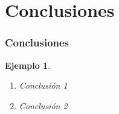 \documentclass{beamer}
\newtheorem{ejemplo}{Ejemplo}
\begin{document}
\section{Conclusiones}

\begin{frame}
\frametitle{Conclusiones}

\begin{ejemplo}
  \begin{enumerate}
    \item
      Conclusión 1
      \pause
    \item
      Conclusión 2
  \end{enumerate}
\end{ejemplo}

\end{frame}
\end{document}
